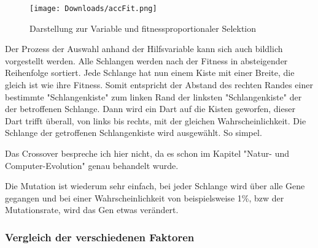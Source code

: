 \documentclass[10pt,a4paper,ngerman,english]{article}
\begin{document}
\begin{wrapfigure}{r}{0.5\textwidth} 
    \vspace{-20pt}
        \begin{center}
            \texttt{[image: Downloads/accFit.png]}
            \caption{Darstellung zur Variable  und fitnessproportionaler Selektion}
        \end{center}
    \vspace{-15pt}
\end{wrapfigure} 

Der Prozess der Auswahl anhand der Hilfsvariable  kann sich auch bildlich vorgestellt werden. Alle Schlangen werden nach der Fitness in absteigender Reihenfolge sortiert. Jede Schlange hat nun einem Kiste mit einer Breite, die gleich ist wie ihre Fitness. Somit entspricht der Abstand des rechten Randes einer bestimmte "Schlangenkiste" zum linken Rand der linksten "Schlangenkiste" der  der betroffenen Schlange. Dann wird ein Dart auf die Kisten geworfen, dieser Dart trifft überall, von links bis rechts, mit der gleichen Wahrscheinlichkeit. Die Schlange der getroffenen Schlangenkiste wird ausgewählt. So simpel.

Das Crossover bespreche ich hier nicht, da es schon im Kapitel "Natur- und Computer-Evolution" genau behandelt wurde.

Die Mutation ist wiederum sehr einfach, bei jeder Schlange wird über alle Gene gegangen und bei einer Wahrscheinlichkeit von beispielsweise 1\%, bzw der Mutationsrate, wird das Gen etwas verändert.

\subsubsection{Vergleich der verschiedenen Faktoren}
\end{document}
